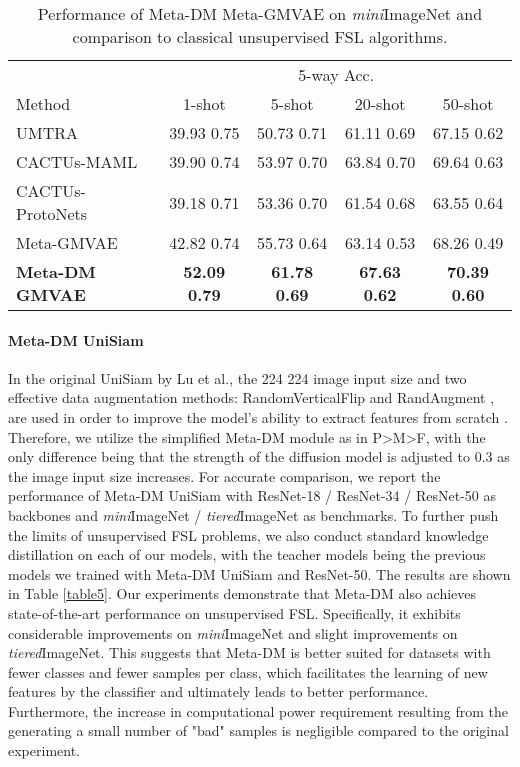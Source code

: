 \documentclass{article}
\begin{document}
\begin{table}
	\caption{Performance of Meta-DM  Meta-GMVAE on \textit{mini}ImageNet and comparison to classical unsupervised FSL algorithms. }
	\centering
	\begin{tabular}{lcccc}
		\toprule
		& \multicolumn{4}{c}{5-way Acc.} \\
		Method  & 1-shot   & 5-shot & 20-shot & 50-shot \\
		\midrule
		UMTRA \cite{i41} & 39.93  0.75  & 50.73  0.71  & 61.11  0.69 & 67.15  0.62\\
		CACTUs-MAML \cite{i45}  & 39.90  0.74  & 53.97  0.70  & 63.84  0.70 & 69.64  0.63 \\
		CACTUs-ProtoNets  & 39.18  0.71  & 53.36  0.70  & 61.54  0.68 & 63.55  0.64 \\
		\midrule
		Meta-GMVAE \cite{i8}  & 42.82  0.74  & 55.73  0.64  & 63.14  0.53 & 68.26  0.49 \\
		\textbf{Meta-DM  GMVAE}  & \textbf{52.09  0.79}  &  \textbf{ 61.78  0.69 } & \textbf{67.63  0.62 }& \textbf{ 70.39  0.60 } \\
		\bottomrule
	\end{tabular}
	\label{table4}
\end{table}


\paragraph{Meta-DM  UniSiam} In the original UniSiam by Lu et al., the 224  224 image input size and two effective data augmentation methods: RandomVerticalFlip and RandAugment \cite{i20}, are used in order to improve the model's ability to extract features from scratch \cite{i10}. Therefore, we utilize the simplified Meta-DM module as in P>M>F, with the only difference being that the strength of the diffusion model is adjusted to 0.3 as the image input size increases. For accurate comparison, we report the performance of Meta-DM  UniSiam with ResNet-18 / ResNet-34 / ResNet-50 as backbones and \textit{mini}ImageNet / \textit{tiered}ImageNet as benchmarks. To further push the limits of unsupervised FSL problems, we also conduct standard knowledge distillation \cite{i49} on each of our models, with the teacher models being the previous models we trained with Meta-DM  UniSiam and ResNet-50. The results are shown in Table \ref{table5}. Our experiments demonstrate that Meta-DM also achieves state-of-the-art performance on unsupervised FSL. Specifically, it exhibits considerable improvements on \textit{mini}ImageNet and slight improvements on \textit{tiered}ImageNet. This suggests that Meta-DM is better suited for datasets with fewer classes and fewer samples per class, which facilitates the learning of new features by the classifier and ultimately leads to better performance. Furthermore, the increase in computational power requirement resulting from the generating a small number of "bad" samples is negligible compared to the original experiment. 
\end{document}
